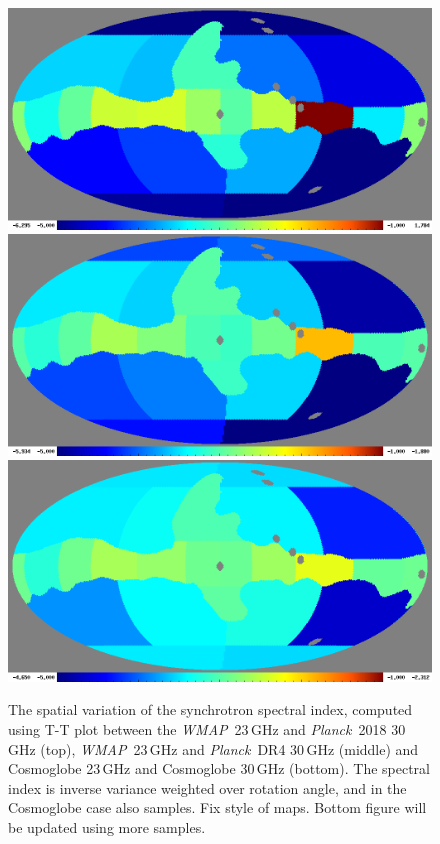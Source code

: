 \documentclass[twocolumn]{../../common/aa}
\def\WMAP{\emph{WMAP}}
\def\Planck{\emph{Planck}}
\newcommand{\red}[0]{\color{red}}
\begin{document}
\begin{figure}
        \centering
        \includegraphics[width=\linewidth]{figures/wmap23_pl2018_ut_spectral_index_scatter_alphamean_1long.png}
        \includegraphics[width=\linewidth]{figures/wmap23_plnpipe_ut_spectral_index_scatter_alphamean_1long.png}
        \includegraphics[width=\linewidth]{figures/coswmap23_cos30_ut_spectral_index_scatter_alphamean_1long.png}
        \caption{The spatial variation of the synchrotron spectral index, computed using T-T plot between the \WMAP\ 23\,GHz and \Planck\ 2018 30\,GHz (top), \WMAP\ 23\,GHz and \Planck\ DR4 30\,GHz (middle) and Cosmoglobe 23\,GHz and Cosmoglobe 30\,GHz (bottom). The spectral index is inverse variance weighted over rotation angle, and in the Cosmoglobe case also samples. {\red Fix style of maps. Bottom figure will be updated using more samples.}}
        \label{fig:cos20_beta_map}
\end{figure}
\end{document}
